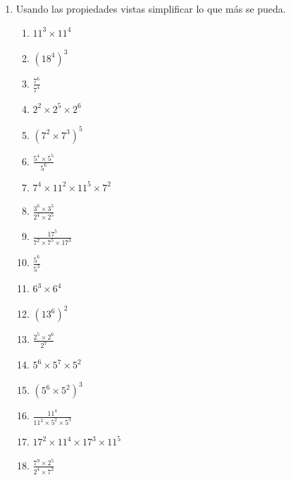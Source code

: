 \begin{enumerate}
	\item Usando las propiedades vistas simplificar lo que más se pueda.
	\begin{multicols}{2}		
		\begin{enumerate}[label=(\Alph*)]
			\item $11^3\times 11^4$
			\item ${(18^4)}^3$
			\item $\frac{7^6}{7^4}$
			\item $2^2\times 2^5\times 2^6$
			\item ${(7^2\times 7^3)}^5$
			\item $\frac{5^4\times 5^5}{5^6}$
			\item $7^4\times 11^2 \times 11^5\times 7^2$
			\item $\frac{3^6 \times 3^5}{2^4\times 2^5}$
			\item $\frac{17^5}{7^2\times 7^5\times 17^3}$
			\item $\frac{5^6}{5^3}$
			\item $6^3\times 6^4$
			\item ${(13^6)}^2$
			\item $\frac{2^5\times 2^6}{2^7}$
			\item $5^6\times 5^7\times 5^2$
			\item ${(5^6\times 5^2)}^3$
			\item $\frac{11^4}{11^2\times 5^2\times 5^3}$
			\item $17^2\times 11^4\times 17^3\times 11^5$
			\item $\frac{7^9\times 2^5}{2^4\times 7^2}$
		\end{enumerate}						
	\end{multicols}
\end{enumerate}
\newpage

